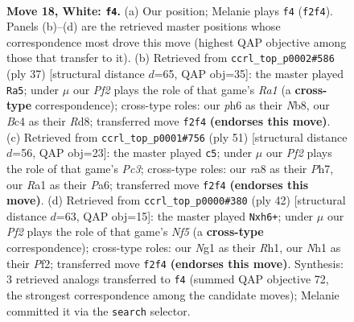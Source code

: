 \documentclass[11pt]{article}
\begin{document}
\clearpage

\begin{figure}[p]\centering
\begin{subfigure}{0.46\textwidth}\centering
\resizebox{\linewidth}{!}{%
\newchessgame
\chessboard[
  setfen={r3kbnr/2n3p1/6bp/p7/2B1p2P/4R3/PP1K1PP1/R5NN w kq - 0 18},
  showmover=false,
  pgfstyle=straightmove, color=movearrow, markmove={f2-f4}
]}
\caption{}
\end{subfigure}\hfill
\begin{subfigure}{0.46\textwidth}\centering
\resizebox{\linewidth}{!}{%
\newchessgame
\chessboard[
  setfen={rn1r2k1/1p2pp1p/5b2/1B1P1p2/8/pRN1P3/P3KPPP/7R b - - 1 19},
  showmover=false,
  pgfstyle=straightmove, color=movearrow, markmove={a8-a5}
]}
\caption{}
\end{subfigure}
\\[4pt]
\begin{subfigure}{0.46\textwidth}\centering
\resizebox{\linewidth}{!}{%
\newchessgame
\chessboard[
  setfen={4r1k1/5p1p/pnp3pb/1r2P3/8/2B2NPP/P1R2P2/4R1K1 b - - 8 26},
  showmover=false,
  pgfstyle=straightmove, color=movearrow, markmove={c6-c5}
]}
\caption{}
\end{subfigure}\hfill
\begin{subfigure}{0.46\textwidth}\centering
\resizebox{\linewidth}{!}{%
\newchessgame
\chessboard[
  setfen={r2r2k1/1p1n1p2/3R1p1p/p3pN2/8/Pb1BP3/1P3PPP/4K2R w K - 10 22},
  showmover=false,
  pgfstyle=straightmove, color=movearrow, markmove={f5-h6}
]}
\caption{}
\end{subfigure}
\caption{\textbf{Move 18, White: \texttt{f4}.} (a) Our position; Melanie plays \texttt{f4} (\texttt{f2f4}). Panels (b)--(d) are the retrieved master positions whose correspondence most drove this move (highest QAP objective among those that transfer to it). (b) Retrieved from \texttt{ccrl\_top\_p0002\#586} (ply 37) [structural distance $d$=65, QAP obj=35]: the master played \texttt{Ra5}; under $\mu$ our \emph{Pf2} plays the role of that game's \emph{Ra1} (a \textbf{cross-type} correspondence); cross-type roles: our \emph{p}h6 as their \emph{N}b8, our \emph{B}c4 as their \emph{R}d8; transferred move \texttt{f2f4} \textbf{(endorses this move)}. (c) Retrieved from \texttt{ccrl\_top\_p0001\#756} (ply 51) [structural distance $d$=56, QAP obj=23]: the master played \texttt{c5}; under $\mu$ our \emph{Pf2} plays the role of that game's \emph{Pc3}; cross-type roles: our \emph{r}a8 as their \emph{P}h7, our \emph{R}a1 as their \emph{P}a6; transferred move \texttt{f2f4} \textbf{(endorses this move)}. (d) Retrieved from \texttt{ccrl\_top\_p0000\#380} (ply 42) [structural distance $d$=63, QAP obj=15]: the master played \texttt{Nxh6+}; under $\mu$ our \emph{Pf2} plays the role of that game's \emph{Nf5} (a \textbf{cross-type} correspondence); cross-type roles: our \emph{N}g1 as their \emph{R}h1, our \emph{N}h1 as their \emph{P}f2; transferred move \texttt{f2f4} \textbf{(endorses this move)}. Synthesis: 3 retrieved analogs transferred to \texttt{f4} (summed QAP objective 72, the strongest correspondence among the candidate moves); Melanie committed it via the \texttt{search} selector.}
\label{fig:thought-m34}
\end{figure}
\end{document}
